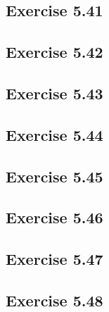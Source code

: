 \documentclass[../Marcus.tex]{subfiles}
\begin{document}
\subsection*{Exercise 5.41}

\subsection*{Exercise 5.42}

\subsection*{Exercise 5.43}

\subsection*{Exercise 5.44}

\subsection*{Exercise 5.45}

\subsection*{Exercise 5.46}

\subsection*{Exercise 5.47}

\subsection*{Exercise 5.48}
\phantom{}
\end{document}
